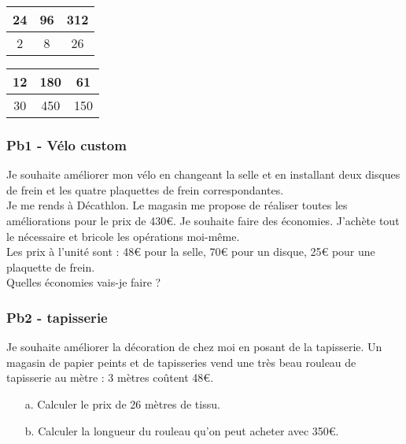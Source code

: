 \begin{multicols}{2}\noindent
  \begin{center}\begin{tabular}{|c|c|c|} \hline
    24 & 96 & 312 \\  \hline
    2 & 8 & 26\\  \hline
  \end{tabular}\end{center}
\columnbreak 
  \begin{center}\begin{tabular}{|c|c|c|} \hline
    12 & 180 & 61 \\  \hline
    30 & 450 & 150\\  \hline
  \end{tabular}\end{center}

\end{multicols}

\subsubsection*{Pb1 - Vélo custom}

Je souhaite améliorer mon vélo en changeant la selle et en installant deux disques de frein et les quatre plaquettes de frein correspondantes. \\

Je me rends à Décathlon. Le magasin me propose de réaliser toutes les améliorations pour le prix de 430€. Je souhaite faire des économies. J'achète tout le nécessaire et bricole les opérations moi-même. \\

Les prix à l'unité sont : 48€ pour la selle, 70€ pour un disque, 25€ pour une plaquette de frein.\\

Quelles économies vais-je faire ?

\subsubsection*{Pb2 - tapisserie}

Je souhaite améliorer la décoration de chez moi en posant de la tapisserie. Un magasin de papier peints et de tapisseries vend une très beau rouleau de tapisserie au mètre : 3 mètres coûtent 48€.

\begin{enumerate}
  \item[a.] Calculer le prix de 26 mètres de tissu.
  \item[b.] Calculer la longueur du rouleau qu'on peut acheter avec 350€.
\end{enumerate}  


